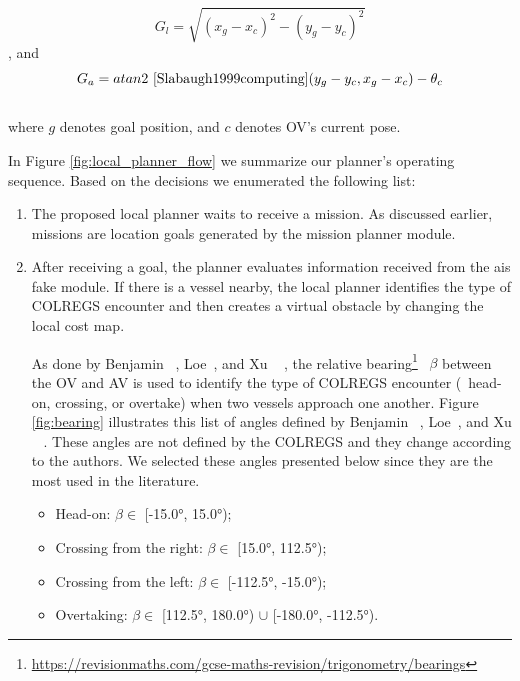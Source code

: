             \[ G_{l} = \sqrt{(x_{g} - x_{c})^2- (y_{g} - y_{c})^2}\], and 
            \[G_{a} = atan2~\cite{Slabaugh1999computing}(y_{g} - y_{c}, x_{g} - x_{c}) - \theta_{c}\]
            \\
            where $g$ denotes goal position, and $c$ denotes \ac{OV}'s current pose. 
            
            In Figure \ref{fig:local_planner_flow} we summarize our planner's operating sequence. Based on the decisions we enumerated the following list: 
            
            \begin{enumerate}
            
                \item The proposed local planner waits to receive a mission. As discussed earlier, missions are location goals generated by the mission planner module.
                \item After receiving a goal, the planner evaluates information received from the ais fake module. If there is a vessel nearby, the local planner identifies the type of \ac{COLREGS} encounter and then creates a virtual obstacle by changing the local cost map. 
                
                As done by Benjamin \etal~\cite{Benjamin2006Method}, Loe~\cite{Loe2007Collision}, and Xu \etal~ \cite{Xu2017Deep}, 
                the relative bearing\footnote{\url{https://revisionmaths.com/gcse-maths-revision/trigonometry/bearings}}~\cite{He2017} $\beta$ between the \ac{OV} and \ac{AV} is used to identify the type of \ac{COLREGS} encounter (\ie~head-on, crossing, or overtake) when two vessels approach one another. Figure \ref{fig:bearing} illustrates this list of angles defined by Benjamin \etal~\cite{Benjamin2006Method}, Loe~\cite{Loe2007Collision}, and Xu \etal~ \cite{Xu2017Deep}. These angles are not defined by the \ac{COLREGS} and they change according to the authors. We selected these angles presented below since they are the most used in the literature.
            
                \begin{itemize}
                    \item Head-on: $\beta \in$ [-15.0°, 15.0°);
                    \item Crossing from the right: $\beta \in$ [15.0°, 112.5°);
                    \item Crossing from the left: $\beta \in$ [-112.5°, -15.0°);
                    \item Overtaking: $\beta \in$ [112.5°, 180.0°) $\cup$ [-180.0°, -112.5°).
                \end{itemize}
                

\end{enumerate}
